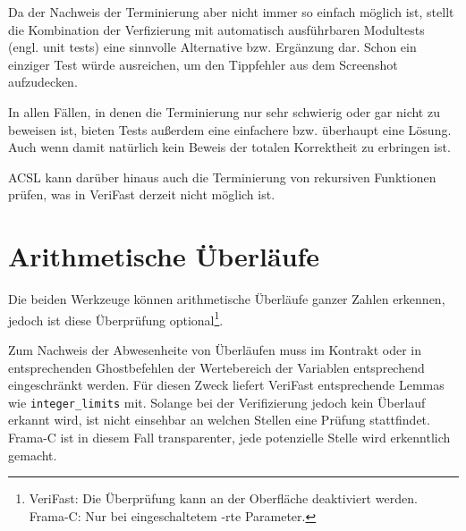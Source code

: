

Da der Nachweis der Terminierung aber nicht immer so einfach möglich ist, stellt die Kombination
der Verfizierung mit automatisch ausführbaren Modultests (engl. unit tests) eine sinnvolle Alternative bzw. Ergänzung dar.
Schon ein einziger Test würde ausreichen, um den Tippfehler aus dem Screenshot aufzudecken. 

In allen Fällen, in denen die Terminierung nur sehr schwierig oder gar nicht zu beweisen ist, bieten
Tests außerdem eine einfachere bzw. überhaupt eine Lösung. Auch wenn damit natürlich
kein Beweis der totalen Korrektheit zu erbringen ist.

ACSL kann darüber hinaus auch die Terminierung von rekursiven Funktionen prüfen, was in
VeriFast derzeit nicht möglich ist.


\section{Arithmetische Überläufe}
\label{sec:implementation:overflows}

Die beiden Werkzeuge können arithmetische Überläufe ganzer Zahlen erkennen, jedoch ist diese Überprüfung
optional\footnote{VeriFast: Die Überprüfung kann an der Oberfläche deaktiviert werden. Frama-C: Nur bei eingeschaltetem -rte Parameter.}.

Zum Nachweis der Abwesenheite von Überläufen muss im Kontrakt oder in entsprechenden Ghostbefehlen der Wertebereich
der Variablen entsprechend eingeschränkt werden. Für diesen Zweck liefert VeriFast entsprechende Lemmas
wie \lstinline{integer_limits} mit. Solange bei der Verifizierung jedoch kein Überlauf erkannt wird,
ist nicht einsehbar an welchen Stellen eine Prüfung stattfindet. Frama-C ist in diesem Fall
transparenter, jede potenzielle Stelle wird erkenntlich gemacht.


